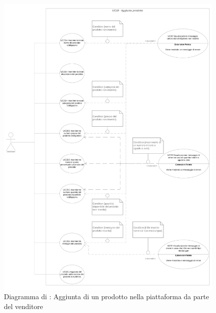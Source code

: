 \begin{figure}[H]
    \centering
    \includegraphics[scale=0.1]{Immagini/DiagrammiUC/UC18AggiuntaProdotto.png}
    \caption{Diagramma di \actualUC: Aggiunta di un prodotto nella piattaforma da parte del venditore} 
    \label{fig:AggiuntaProdotto}
\end{figure}

